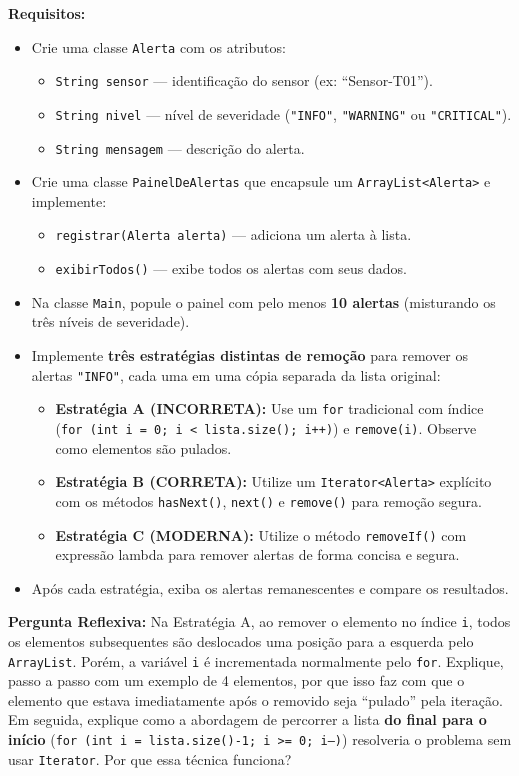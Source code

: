 \documentclass[12pt, a4paper]{article}
\begin{document}
\textbf{Requisitos:}
\begin{itemize}
    \item Crie uma classe \texttt{Alerta} com os atributos:
    \begin{itemize}
        \item \texttt{String sensor} — identificação do sensor (ex: ``Sensor-T01'').
        \item \texttt{String nivel} — nível de severidade (\texttt{"INFO"}, \texttt{"WARNING"} ou \texttt{"CRITICAL"}).
        \item \texttt{String mensagem} — descrição do alerta.
    \end{itemize}
    \item Crie uma classe \texttt{PainelDeAlertas} que encapsule um \texttt{ArrayList<Alerta>} e implemente:
    \begin{itemize}
        \item \texttt{registrar(Alerta alerta)} — adiciona um alerta à lista.
        \item \texttt{exibirTodos()} — exibe todos os alertas com seus dados.
    \end{itemize}
    \item Na classe \texttt{Main}, popule o painel com pelo menos \textbf{10 alertas} (misturando os três níveis de severidade).
    \item Implemente \textbf{três estratégias distintas de remoção} para remover os alertas \texttt{"INFO"}, cada uma em uma cópia separada da lista original:
    \begin{itemize}
        \item \textbf{Estratégia A (INCORRETA):} Use um \texttt{for} tradicional com índice (\texttt{for (int i = 0; i < lista.size(); i++)}) e \texttt{remove(i)}. Observe como elementos são pulados.
        \item \textbf{Estratégia B (CORRETA):} Utilize um \texttt{Iterator<Alerta>} explícito com os métodos \texttt{hasNext()}, \texttt{next()} e \texttt{remove()} para remoção segura.
        \item \textbf{Estratégia C (MODERNA):} Utilize o método \texttt{removeIf()} com expressão lambda para remover alertas de forma concisa e segura.
    \end{itemize}
    \item Após cada estratégia, exiba os alertas remanescentes e compare os resultados.
\end{itemize}

\textbf{Pergunta Reflexiva:} Na Estratégia A, ao remover o elemento no índice \texttt{i}, todos os elementos subsequentes são deslocados uma posição para a esquerda pelo \texttt{ArrayList}. Porém, a variável \texttt{i} é incrementada normalmente pelo \texttt{for}. Explique, passo a passo com um exemplo de 4 elementos, por que isso faz com que o elemento que estava imediatamente após o removido seja ``pulado'' pela iteração. Em seguida, explique como a abordagem de percorrer a lista \textbf{do final para o início} (\texttt{for (int i = lista.size()-1; i >= 0; i--)}) resolveria o problema sem usar \texttt{Iterator}. Por que essa técnica funciona?
\end{document}
